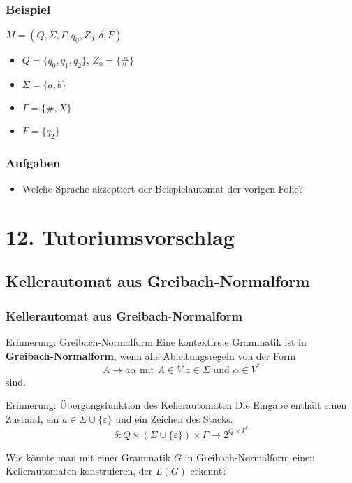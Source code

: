 \documentclass{beamer}
\begin{document}
{\begin{frame}
\frametitle{Beispiel}
$M = (Q, \Sigma, \Gamma, q_0, Z_0, \delta, F)$
\begin{itemize}
\item $Q = \{q_0, q_1, q_2\}$, $Z_0 = \{\#\}$
\item $\Sigma = \{a,b\}$
\item $\Gamma = \{\#,X\}$
\item $F = \{q_2\}$
\end{itemize}
\begin{figure}
\end{figure}
\end{frame}

\begin{frame}
\frametitle{Aufgaben}
\begin{itemize}
\item Welche Sprache akzeptiert der Beispielautomat der vorigen Folie?
\end{itemize}
\end{frame}

}
%

\section{12. Tutoriumsvorschlag}
\subsection{Kellerautomat aus Greibach-Normalform}
\begin{frame}
 \frametitle{Kellerautomat aus Greibach-Normalform}
 \begin{block}{Erinnerung: Greibach-Normalform}
  Eine kontextfreie Grammatik ist in \textbf{Greibach-Normalform}, wenn alle Ableitungsregeln von der Form   
  \[ A \rightarrow a\alpha \text{ mit } A \in V\text{,} a\in \Sigma \text{ und } \alpha \in V^*\]
  sind.
 \end{block}
 \pause
 \begin{block}{Erinnerung: Übergangsfunktion des Kellerautomaten}
 Die Eingabe enthält einen Zustand, ein $a \in \Sigma \cup \{\varepsilon\}$ und ein Zeichen des Stacks.
 \[\delta : Q \times ( \Sigma \cup \{\varepsilon\}) \times \Gamma \rightarrow 2^{Q \times \Gamma^*}\]
 \vspace{-0.5cm}
 \end{block}
 \pause
 Wie könnte man mit einer Grammatik $G$ in Greibach-Normalform einen Kellerautomaten konstruieren, der $L(G)$ erkennt?
\end{frame}
\end{document}

